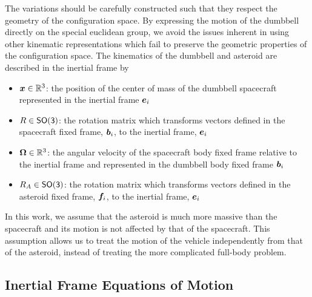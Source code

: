The variations should be carefully constructed such that they respect the geometry of the configuration space.
By expressing the motion of the dumbbell directly on the special euclidean group, we avoid the issues inherent in using other kinematic representations which fail to preserve the geometric properties of the configuration space.
The kinematics of the dumbbell and asteroid are described in the inertial frame by
\begin{itemize}
    \item \( \bm{x} \in \mathbb{R}^3 \): the position of the center of mass of the dumbbell spacecraft represented in the inertial frame \( \bm{e}_i\)
    \item \( R \in \mathsf{SO(3)}\): the rotation matrix which transforms vectors defined in the spacecraft fixed frame, \( \bm{b}_i \), to the inertial frame, \( \bm{e}_i \)
    \item \( \bm{\Omega} \in \mathbb{R}^3 \): the angular velocity of the spacecraft body fixed frame relative to the inertial frame and represented in the dumbbell body fixed frame \( \bm{b}_i \)
    \item \( R_A \in \mathsf{SO(3)} \): the rotation matrix which transforms vectors defined in the asteroid fixed frame, \( \bm{f}_i \), to the inertial frame, \( \bm{e}_i \)
\end{itemize}
In this work, we assume that the asteroid is much more massive than the spacecraft and its motion is not affected by that of the spacecraft.
This assumption allows us to treat the motion of the vehicle independently from that of the asteroid, instead of treating the more complicated full-body problem. 
\subsection{Inertial Frame Equations of Motion}



